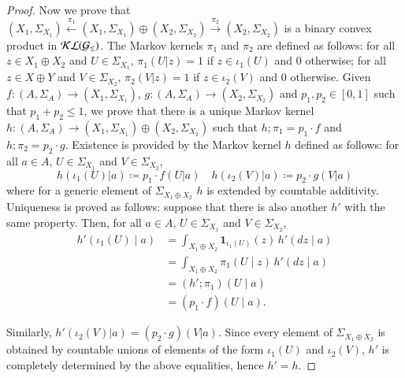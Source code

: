 \begin{proof}
Now we prove that $(X_1,\Sigma_{X_1})\overset{\pi_1}{\leftarrow}(X_1,\Sigma_{X_1})\oplus (X_2,\Sigma_{X_2})\overset{\pi_2}{\rightarrow} (X_2,\Sigma_{X_2})$ is a binary convex product in $\mathcal{KL}({\mathcal{G}_{\le}})$. The Markov kernels $\pi_1$ and $\pi_2$ are defined as follows: for all $z\in X_1\oplus X_2$ and $U\in \Sigma_{X_1}$, $\pi_1(U|z)=1$ if $z\in \iota_1(U)$ and $0$ otherwise; for all $z\in X\oplus Y$ and $V\in \Sigma_{X_2}$, $\pi_2(V|z)=1$ if $z\in \iota_2(V)$ and $0$ otherwise. Given $f\colon (A,\Sigma_A)\to (X_1,\Sigma_{X_1})$, $g\colon (A,\Sigma_A)\to (X_2,\Sigma_{X_2})$ and $p_1,p_2\in [0,1]$ such that $p_1+p_2\leq 1$, we prove that there is a unique Markov kernel $h\colon (A,\Sigma_A)\to (X_1,\Sigma_{X_1})\oplus (X_2,\Sigma_{X_2})$ such that $h;\pi_1 = p_1\cdot f$ and $h;\pi_2 = p_2\cdot g$. Existence is provided by the Markov kernel $h$ defined as follows: for all $a\in A$, $U\in \Sigma_{X_1}$ and $V\in \Sigma_{X_2}$,
\[ h(\iota_1(U)|a)\coloneqq p_1\cdot f(U|a) \quad h(\iota_2(V)|a)\coloneqq p_2\cdot g(V|a) \]
where for a generic element of $\Sigma_{X_1\oplus X_2}$ $h$ is extended by countable additivity. Uniqueness is proved as follows: suppose that there is also another $h'$ with the same property. Then, for all $a\in A$, $U\in \Sigma_{X_1}$ and $V\in \Sigma_{X_2}$, 
\begin{align}
    h'(\iota_1(U)\mid a)
    &= \int_{X_1 \oplus X_2} \mathbf{1}_{\iota_1(U)}(z)\, h'(dz\mid a)
    \tag{def. of integration w.r.t.\ $h'(\cdot\mid a)$}\\
    &= \int_{X_1 \oplus X_2} \pi_1(U\mid z)\, h'(dz\mid a)
    \tag{def. of indicator function}\\
    &= (h';\pi_1)(U\mid a)
    \tag{kernel composition}\\
    &= (p_1\cdot f)(U\mid a)
    \tag{hp. $h';\pi_1 = p_1\cdot f$}.
\end{align}


Similarly, $h'(\iota_2(V)|a)=(p_2\cdot g)(V|a)$. Since every element of $\Sigma_{X_1\oplus X_2}$ is obtained by countable unions of elements of the form $\iota_1(U)$ and $\iota_2(V)$, $h'$ is completely determined by the above equalities, hence $h'=h$.
\end{proof}

